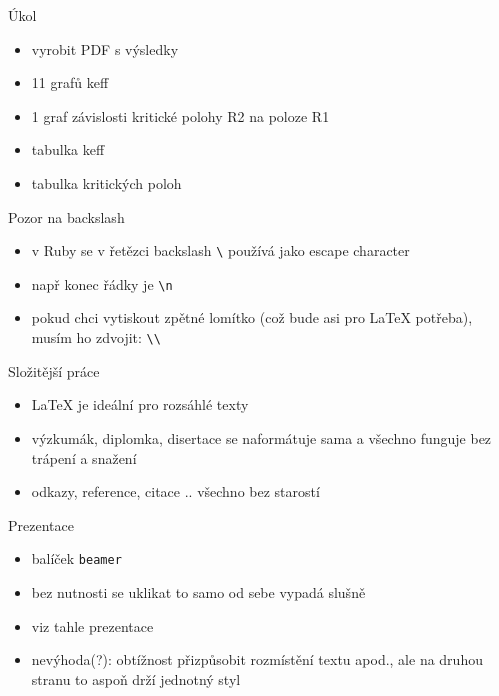 \documentclass{beamer}
\begin{document}
\begin{frame}{Úkol}
  \begin{itemize}
    \item vyrobit PDF s výsledky
    \item 11 grafů keff
    \item 1 graf závislosti kritické polohy R2 na poloze R1
    \item tabulka keff
    \item tabulka kritických poloh
  \end{itemize}
\end{frame}

\begin{frame}{Pozor na backslash}
  \begin{itemize}
    \item v Ruby se v řetězci backslash \texttt{\textbackslash} používá jako escape character
    \item např konec řádky je \texttt{\textbackslash n}
    \item pokud chci vytiskout zpětné lomítko (což bude asi pro LaTeX potřeba), musím ho zdvojit: \texttt{\textbackslash \textbackslash}
  \end{itemize}
\end{frame}

\begin{frame}{Složitější práce}
  \begin{itemize}
    \item LaTeX je ideální pro rozsáhlé texty
    \item výzkumák, diplomka, disertace se naformátuje sama a všechno funguje bez trápení a snažení
    \item odkazy, reference, citace .. všechno bez starostí
  \end{itemize}
\end{frame}

\begin{frame}{Prezentace}
  \begin{itemize}
    \item balíček \texttt{beamer}
    \item bez nutnosti se uklikat to samo od sebe vypadá slušně
    \item viz tahle prezentace
    \item nevýhoda(?): obtížnost přizpůsobit rozmístění textu apod., ale na druhou stranu to aspoň drží jednotný styl
  \end{itemize}
\end{frame}
\end{document}
